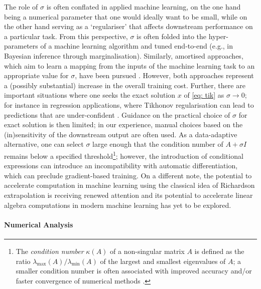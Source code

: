 \documentclass[10pt]{article} %
\newcommand{\nugget}{\sigma}
\begin{document}
The role of $\nugget$ is often conflated in applied machine learning, on the one hand being a numerical parameter that one would ideally want to be small, while on the other hand serving as a `regulariser' that affects downstream performance on a particular task.
From this perspective, $\nugget$ is often folded into the hyper-parameters of a machine learning algorithm and tuned end-to-end (e.g., in Bayesian inference through marginalisation).
Similarly, amortised approaches, which aim to learn a mapping from the inputs of the machine learning task to an appropriate value for $\nugget$, have been pursued \citep{chung2017learning,alberti2021learning,de2022machine}.
However, both approaches represent a (possibly substantial) increase in the overall training cost.
Further, there are important situations where one seeks the exact solution $x$ of \eqref{eq: tik} as $\nugget \rightarrow 0$; for instance in regression applications, where Tikhonov regularisation can lead to predictions that are under-confident \citep{andrianakis2012effect}.
Guidance on the practical choice of $\nugget$ for exact solution is then limited; in our experience, manual choices based on the (in)sensitivity of the downstream output are often used.
As a data-adaptive alternative, one can select $\nugget$ large enough that the condition number of $A + \nugget I$ remains below a specified threshold\footnote{The \emph{condition number} $\kappa(A)$ of a non-singular matrix $A$ is defined as the ratio $\lambda_{\max}(A) / \lambda_{\min}(A)$ of the largest and smallest eigenvalues of $A$; a smaller condition number is often associated with improved accuracy and/or faster convergence of numerical methods \citep{trefethen2022numerical}. }; however, the introduction of conditional expressions can introduce an incompatibility with automatic differentiation, which can preclude gradient-based training.
On a different note, the potential to accelerate computation in machine learning using the classical idea of Richardson extrapolation is receiving renewed attention \citep{bach2021effectiveness,oates2025probabilistic} and its potential to accelerate linear algebra computations in modern machine learning has yet to be explored.


\paragraph{Numerical Analysis}
\end{document}
